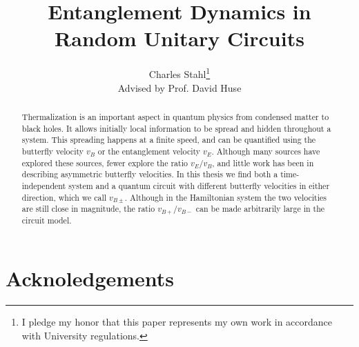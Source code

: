 \title{Entanglement Dynamics in Random Unitary Circuits}
\author{Charles Stahl\footnote{I pledge my honor that this paper represents my own work in accordance with University regulations.}\\
	Advised by Prof. David Huse}

\maketitle

\begin{abstract}
	Thermalization is an important aspect in quantum physics from condensed matter to black holes. It allows initially local information to be spread and hidden throughout a system. This spreading happens at a finite speed, and can be quantified using the butterfly velocity $v_B$ or the entanglement velocity $v_E$. Although many sources have explored these sources, fewer explore the ratio $v_E/v_B$, and little work has been in describing asymmetric butterfly velocities. In this thesis we find both a time-independent system and a quantum circuit with different butterfly velocities in either direction, which we call $v_{B\pm}$. Although in the Hamiltonian system the two velocities are still close in magnitude, the ratio $v_{B+}/v_{B-}$ can be made arbitrarily large in the circuit model.
\end{abstract}

\newpage

\section*{Acknoledgements}

\newpage

\tableofcontents